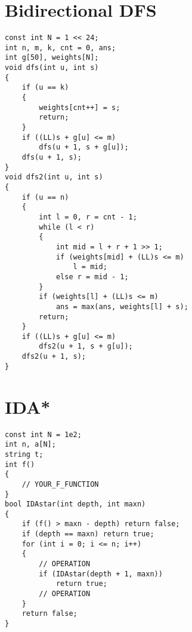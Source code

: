 \section{Bidirectional DFS}
\begin{lstlisting}
const int N = 1 << 24;
int n, m, k, cnt = 0, ans;
int g[50], weights[N];
void dfs(int u, int s)
{
    if (u == k)
    {
        weights[cnt++] = s;
        return;
    }
    if ((LL)s + g[u] <= m)
        dfs(u + 1, s + g[u]);
    dfs(u + 1, s);
}
void dfs2(int u, int s)
{
    if (u == n)
    {
        int l = 0, r = cnt - 1;
        while (l < r)
        {
            int mid = l + r + 1 >> 1;
            if (weights[mid] + (LL)s <= m)
                l = mid;
            else r = mid - 1;
        }
        if (weights[l] + (LL)s <= m)
            ans = max(ans, weights[l] + s);
        return;
    }
    if ((LL)s + g[u] <= m)
        dfs2(u + 1, s + g[u]);
    dfs2(u + 1, s);
}
\end{lstlisting}
\section{IDA*}
\begin{lstlisting}
const int N = 1e2;
int n, a[N];
string t;
int f()
{
    // YOUR_F_FUNCTION
}
bool IDAstar(int depth, int maxn)
{
    if (f() > maxn - depth) return false;
    if (depth == maxn) return true;
    for (int i = 0; i <= n; i++)
    {
        // OPERATION
        if (IDAstar(depth + 1, maxn))
            return true;
        // OPERATION
    }
    return false;
}
\end{lstlisting}